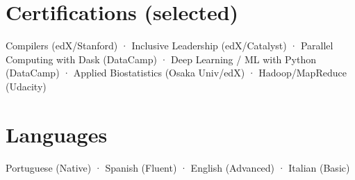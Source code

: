 \documentclass[10pt,a4paper]{article}
\begin{document}
\section{Certifications (selected)}
Compilers (edX/Stanford) · Inclusive Leadership (edX/Catalyst) · Parallel Computing with Dask (DataCamp) ·
Deep Learning / ML with Python (DataCamp) · Applied Biostatistics (Osaka Univ/edX) · Hadoop/MapReduce (Udacity)

\section{Languages}
Portuguese (Native) · Spanish (Fluent) · English (Advanced) · Italian (Basic)
\end{document}
